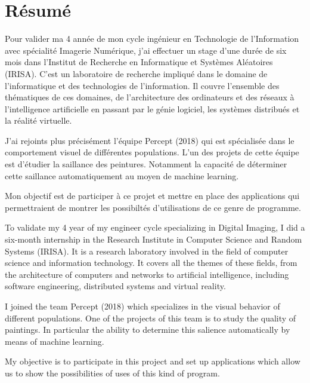 \chapter*{Résumé}
\par
    Pour valider ma 4 année de mon cycle ingénieur en Technologie de 
    l'Information avec spécialité Imagerie Numérique, j'ai effectuer un stage 
    d'une durée de six mois dans l'Institut de Recherche en Informatique et 
    Systèmes Aléatoires (IRISA). C'est un laboratoire de recherche impliqué dans 
    le domaine de l'informatique et des technologies de l'information. Il couvre 
    l'ensemble des thématiques de ces domaines, de l’architecture des 
    ordinateurs et des réseaux à l’intelligence artificielle en passant par le 
    génie logiciel, les systèmes distribués et la réalité virtuelle.

\par
    J'ai rejoints plus précisément l'équipe Percept (2018) qui est spécialisée 
    dans le comportement visuel de différentes populations. L'un des projets de 
    cette équipe est d'étudier la saillance des peintures. Notamment la capacité 
    de déterminer cette saillance automatiquement au moyen de machine learning.

\par
    Mon objectif est de participer à ce projet et mettre en place des 
    applications qui permettraient de montrer les possibiltés d'utilisations de 
    ce genre de programme.

\vspace{40pt}

\color{gray}
\par
    To validate my 4 year of my engineer cycle specializing in Digital 
    Imaging, I did a six-month internship in the Research Institute in Computer 
    Science and Random Systems (IRISA). It is a research laboratory involved in 
    the field of computer science and information technology. It covers all the 
    themes of these fields, from the architecture of computers and networks to 
    artificial intelligence, including software engineering, distributed systems 
    and virtual reality. 

\par
    I joined the team Percept (2018) which specializes in the visual behavior of 
    different populations. One of the projects of this team is to study the 
    quality of paintings. In particular the ability to determine this salience 
    automatically by means of machine learning. 

\par
    My objective is to participate in this project and set up applications which 
    allow us to show the possibilities of uses of this kind of program.

\color{black}